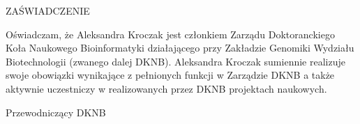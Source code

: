\documentclass[12pt,firstpage,polish,a4paper]{letter}
\date{Wrocław, \today}
\newcommand{\memberName}{Aleksandra Kroczak }
\begin{document}
 
\begin{letter}{}{}
 
\begin{center}\opening{ZAŚWIADCZENIE}
\end{center}

Oświadczam, że \memberName jest członkiem Zarządu Doktoranckiego Koła Naukowego Bioinformatyki działającego przy Zakładzie Genomiki Wydziału Biotechnologii (zwanego dalej DKNB). \memberName sumiennie realizuje swoje obowiązki wynikające z pełnionych funkcji w Zarządzie DKNB a także aktywnie uczestniczy w realizowanych przez DKNB projektach naukowych.

\vfill

\begin{flushright}Przewodniczący DKNB
\end{flushright}
\end{letter}
\end{document}
